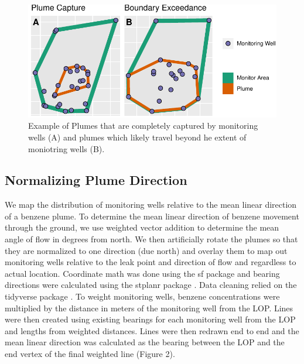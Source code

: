 \documentclass[draft,linenumbers]{agujournal2018}
\begin{document}
\begin{figure}[!h]
\includegraphics{CA_Benzene_Plumes_files/figure-latex/exceedsExample-1} \caption{Example of Plumes that are completely captured by monitoring wells (A) and plumes which likely travel beyond he extent of moniotring wells (B).}\label{fig:exceedsExample}
\end{figure}

\subsection{Normalizing Plume Direction}

We map the distribution of monitoring wells relative to the mean linear
direction of a benzene plume. To determine the mean linear direction of
benzene movement through the ground, we use weighted vector addition to
determine the mean angle of flow in degrees from north. We then
artificially rotate the plumes so that they are normalized to one
direction (due north) and overlay them to map out monitoring wells
relative to the leak point and direction of flow and regardless to
actual location. Coordinate math was done using the sf package
\citep{sf} and bearing directions were calculated using the stplanr
package \citep{stplanr}. Data cleaning relied on the tidyverse package
\citep{tidyverse}. To weight monitoring wells, benzene concentrations
were multiplied by the distance in meters of the monitoring well from
the LOP. Lines were then created using existing bearings for each
monitoring well from the LOP and lengths from weighted distances. Lines
were then redrawn end to end and the mean linear direction was
calculated as the bearing between the LOP and the end vertex of the
final weighted line (Figure 2).
\end{document}
